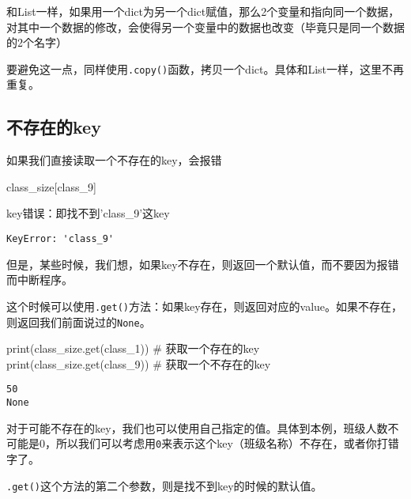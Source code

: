 \documentclass[
  letterpaper,
  DIV=11,
  numbers=noendperiod]{scrreprt}
\newenvironment{Shaded}{\begin{snugshade}}{\end{snugshade}}
\newcommand{\BuiltInTok}[1]{\textcolor[rgb]{0.00,0.23,0.31}{#1}}
\newcommand{\CommentTok}[1]{\textcolor[rgb]{0.37,0.37,0.37}{#1}}
\newcommand{\NormalTok}[1]{\textcolor[rgb]{0.00,0.23,0.31}{#1}}
\newcommand{\StringTok}[1]{\textcolor[rgb]{0.13,0.47,0.30}{#1}}
\begin{document}
和List一样，如果用一个dict为另一个dict赋值，那么2个变量和指向同一个数据，对其中一个数据的修改，会使得另一个变量中的数据也改变（毕竟只是同一个数据的2个名字）

要避免这一点，同样使用\texttt{.copy()}函数，拷贝一个dict。具体和List一样，这里不再重复。

\hypertarget{ux4e0dux5b58ux5728ux7684key}{%
\subsection{不存在的key}\label{ux4e0dux5b58ux5728ux7684key}}

如果我们直接读取一个不存在的key，会报错

\begin{Shaded}
\begin{Highlighting}[]
\NormalTok{class\_size[}\StringTok{\textquotesingle{}class\_9\textquotesingle{}}\NormalTok{]}
\end{Highlighting}
\end{Shaded}

key错误：即找不到'class\_9'这key

\begin{verbatim}
KeyError: 'class_9'
\end{verbatim}

但是，某些时候，我们想，如果key不存在，则返回一个默认值，而不要因为报错而中断程序。

这个时候可以使用\texttt{.get()}方法：如果key存在，则返回对应的value。如果不存在，则返回我们前面说过的\texttt{None}。

\begin{Shaded}
\begin{Highlighting}[]
\BuiltInTok{print}\NormalTok{(class\_size.get(}\StringTok{\textquotesingle{}class\_1\textquotesingle{}}\NormalTok{)) }\CommentTok{\# 获取一个存在的key}
\BuiltInTok{print}\NormalTok{(class\_size.get(}\StringTok{\textquotesingle{}class\_9\textquotesingle{}}\NormalTok{)) }\CommentTok{\# 获取一个不存在的key}
\end{Highlighting}
\end{Shaded}

\begin{verbatim}
50
None
\end{verbatim}

对于可能不存在的key，我们也可以使用自己指定的值。具体到本例，班级人数不可能是0，所以我们可以考虑用\texttt{0}来表示这个key（班级名称）不存在，或者你打错字了。

\texttt{.get()}这个方法的第二个参数，则是找不到key的时候的默认值。
\end{document}
